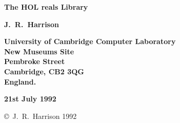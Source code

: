 
\begin{titlepage}

\setcounter{page}{1}                      %


\mbox{}
\vskip20mm
\begin{center}
{\Huge\bf The HOL reals Library}
\end{center}


\vskip15mm
\begin{center}
\large\bf J.\ R.\ Harrison
\end{center}


\vfill
\begin{center}
\bf
University of Cambridge Computer Laboratory\\
New Museums Site\\
Pembroke Street\\
Cambridge, {\small\bf CB}2 3{\small\bf QG}\\
England.
\end{center}


\vskip5mm
\begin{center}
\bf 21st July 1992
\end{center}

\end{titlepage}

\thispagestyle{empty}
\mbox{}

\vfill
\begin{center}
\copyright\ J.\ R.\ Harrison 1992
\end{center}
\newpage
